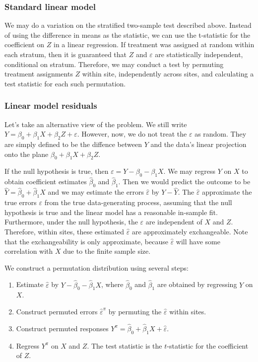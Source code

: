 \documentclass[11pt]{article}
\newcommand{\todo}[1]{{\color{red}{TO DO: \sc #1}}}
\begin{document}
\subsubsection{Standard linear model}
We may do a variation on the stratified two-sample test described above.
Instead of using the difference in means as the statistic, we can use the t-statistic for the coefficient on $Z$ in a linear regression.
If treatment was assigned at random within each stratum, then it is guaranteed that $Z$ and $\varepsilon$ are statistically independent, conditional on stratum.
Therefore, we may conduct a test by permuting treatment assignments $Z$ within site, independently across sites, and calculating a test statistic for each such permutation.

\subsubsection{Linear model residuals}

Let's take an alternative view of the problem.
We still write $Y = \beta_0 + \beta_1 X + \beta_2 Z + \varepsilon$.
However, now, we do not treat the $\varepsilon$ as random.
They are simply defined to be the diffence between $Y$ and the data's linear projection onto the plane $\beta_0 + \beta_1 X + \beta_2 Z$.

If the null hypothesis is true, then $\varepsilon = Y - \beta_0 - \beta_1X$.
We may regress $Y$ on $X$ to obtain coefficient estimates $\hat{\beta}_0$ and $\hat{\beta}_1$.
Then we would predict the outcome to be $\hat{Y} = \hat{\beta}_0 + \hat{\beta}_1X$
and we may estimate the errors $\hat{\varepsilon}$ by $Y - \hat{Y}$.
The $\hat{\varepsilon}$ approximate the true errors $\varepsilon$ from the true data-generating process, assuming that the null hypothesis is true and the linear model has a reasonable in-sample fit.
Furthermore, under the null hypothesis, the $\varepsilon$ are independent of $X$ and $Z$. \todo{ this is false. fix}
Therefore, within sites, these estimated $\hat{\varepsilon}$ are approximately exchangeable.
Note that the exchangeability is only approximate, because $\hat{\varepsilon}$ will have some correlation with $X$ due to the finite sample size. \todo{ fix wording}

We construct a permutation distribution using several steps:

\begin{enumerate}
\item Estimate $\hat{\varepsilon}$ by $Y - \hat{\beta}_0 - \hat{\beta}_1 X$, where $\hat{\beta}_0$ and $\hat{\beta}_1$ are obtained by regressing $Y$ on $X$.
\item Construct permuted errors $\hat{\varepsilon}^\pi$ by permuting the $\hat{\varepsilon}$ within sites.
\item Construct permuted responses $Y^\pi = \hat{\beta}_0 + \hat{\beta}_1 X + \hat{\varepsilon}$.
\item Regress $Y^\pi$ on $X$ and $Z$. The test statistic is the $t$-statistic for the coefficient of $Z$.
\end{enumerate}
\end{document}
